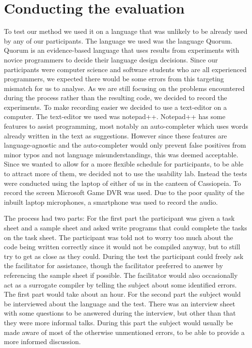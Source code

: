 \chapter{Conducting the evaluation}
To test our method we used it on a language that was unlikely to be already used by any of our participants.
The language we used was the language Quorum.
Quorum is an evidence-based language that uses results from experiments with novice programmers to decide their language design decisions.
Since our participants were computer science and software students who are all experienced programmers, we expected there would be some errors from this targeting mismatch for us to analyse.
As we are still focusing on the problems encountered during the process rather than the resulting code, we decided to record the experiments.
To make recording easier we decided to use a text-editor on a computer.
The text-editor we used was notepad++.
Notepad++ has some features to assist programming, most notably an auto-completer which uses words already written in the text as suggestions.
However since these features are language-agnostic and the auto-completer would only prevent false positives from minor typos and not language misunderstandings, this was deemed acceptable.%
Since we wanted to allow for a more flexible schedule for participants, to be able to attract more of them, we decided not to use the usability lab.
Instead the tests were conducted using the laptop of either of us in the canteen of Cassiopeia.
To record the screen Microsoft Game DVR was used.
Due to the poor quality of the inbuilt laptop microphones, a smartphone was used to record the audio.%

The process had two parts:
For the first part the participant was given a task sheet and a sample sheet and asked write programs that could complete the tasks on the task sheet.
The participant was told not to worry too much about the code being written correctly since it would not be compiled anyway, but to still try to get as close as they could.
During the test the participant could freely ask the facilitator for assistance, though the facilitator preferred to answer by referencing the sample sheet if possible.
The facilitator would also occasionally act as a surrogate compiler by telling the subject about some identified errors.%
The first part would take about an hour.
For the second part the subject would be interviewed about the language and the test.
There was an interview sheet with some questions to be answered during the interview, but other than that they were more informal talks.
During this part the subject would usually be made aware of most of the otherwise unmentioned errors, to be able to provide a more informed discussion.

